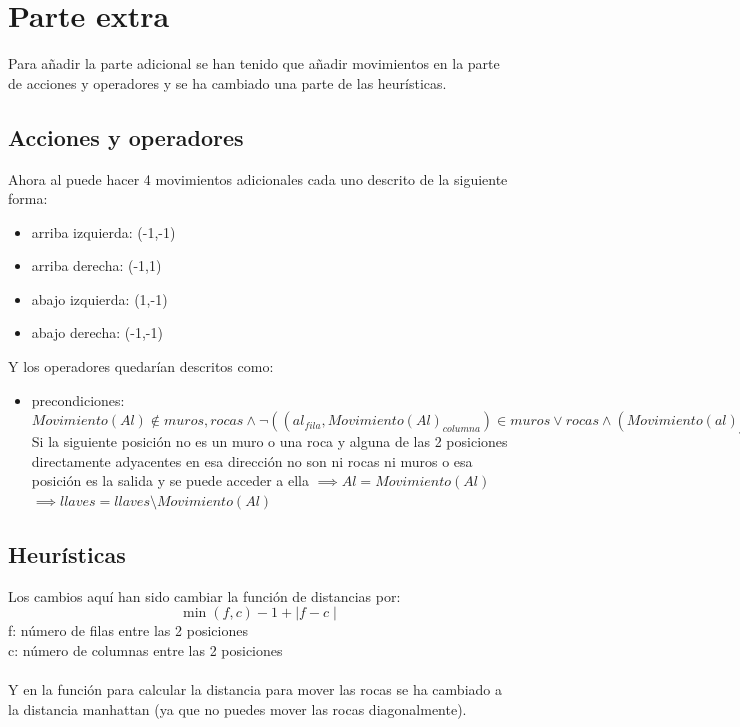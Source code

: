 \documentclass[11pt,spanish]{article}
\begin{document}
	\section{Parte extra}
	Para añadir la parte adicional se han tenido que añadir movimientos en la parte de acciones y operadores y se ha cambiado una parte de las heurísticas.
		\subsection{Acciones y operadores}
			Ahora al puede hacer 4 movimientos adicionales cada uno descrito de la siguiente forma:
			\begin{itemize}
				\item arriba izquierda: (-1,-1)
				\item arriba derecha: (-1,1)
				\item abajo izquierda: (1,-1)
				\item abajo derecha: (-1,-1)
			\end{itemize}
			Y los operadores quedarían descritos como:
			\begin{itemize}
				\item precondiciones: $Movimiento(Al) \notin muros, rocas \land \neg((al_{fila},Movimiento(Al)_{columna}) \in muros \lor rocas  \land (Movimiento(al)_{fila},Al_{columna}) \in muros \lor rocas)\lor (llaves = \emptyset \land Movimiento(Al) = salida)$\\Si la siguiente posición no es un muro o una roca y alguna de las 2 posiciones directamente adyacentes en esa dirección no son ni rocas ni muros o  esa posición es la salida y se puede acceder a ella
				$\implies Al = Movimiento(Al)$\\
				$\implies llaves = llaves\setminus Movimiento(Al)$
			\end{itemize}
		\subsection{Heurísticas}
			Los cambios aquí han sido cambiar la función de distancias por:\\
			$$\min(f,c)-1 + \mid f-c\mid$$
			f: número de filas entre las 2 posiciones\\
			c: número de columnas entre las 2 posiciones\\
			\\
			Y en la función para calcular la distancia para mover las rocas se ha cambiado a la distancia manhattan (ya que no puedes mover las rocas diagonalmente).\\
\end{document}
